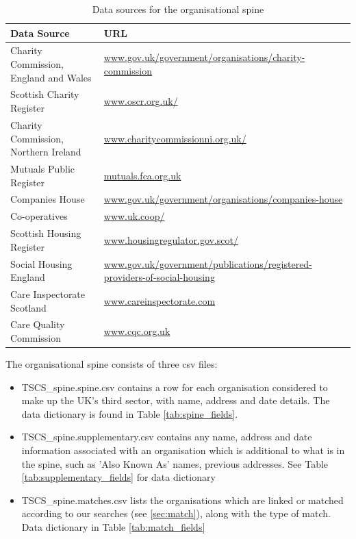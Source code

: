 \documentclass{article}
\begin{document}
\begin{table}[h]
\centering
\begin{tabularx}{\textwidth}{|l|X|}
\hline
Data Source & URL \\ \hline
Charity Commission, England and Wales	& \url{www.gov.uk/government/organisations/charity-commission}\\ \hline
Scottish Charity Register	& \url{www.oscr.org.uk/}\\ \hline
Charity Commission, Northern Ireland	& \url{www.charitycommissionni.org.uk/} \\ \hline
Mutuals Public Register 	& \url{mutuals.fca.org.uk} \\ \hline
Companies House 	& \url{www.gov.uk/government/organisations/companies-house} \\ \hline
Co-operatives 	& \url{www.uk.coop/} \\ \hline
Scottish Housing Register 	& \url{www.housingregulator.gov.scot/} \\ \hline
Social Housing England 	& \url{www.gov.uk/government/publications/registered-providers-of-social-housing} \\ \hline
Care Inspectorate Scotland 	& \url{www.careinspectorate.com} \\ \hline
Care Quality Commission 	& \url{www.cqc.org.uk}\\ \hline
\end{tabularx}
\caption{Data sources for the organisational spine}
\label{tab:sources}
\end{table}


The organisational spine consists of three csv files: 
\begin{itemize}
\item TSCS\_spine.spine.csv contains a row for each organisation considered to make up the UK's third sector, with name, address and date details. The data dictionary
is found in Table \ref{tab:spine_fields}.
\item TSCS\_spine.supplementary.csv contains any name, address and date information associated with an organisation which is additional to what is in the spine, 
such as 'Also Known As' names, previous addresses. See Table \ref{tab:supplementary_fields} for data dictionary
\item TSCS\_spine.matches.csv lists the organisations which are linked or matched according to our searches (see \ref{sec:match}), along with the type of match. Data dictionary
in Table \ref{tab:match_fields}
\end{itemize}
\end{document}
